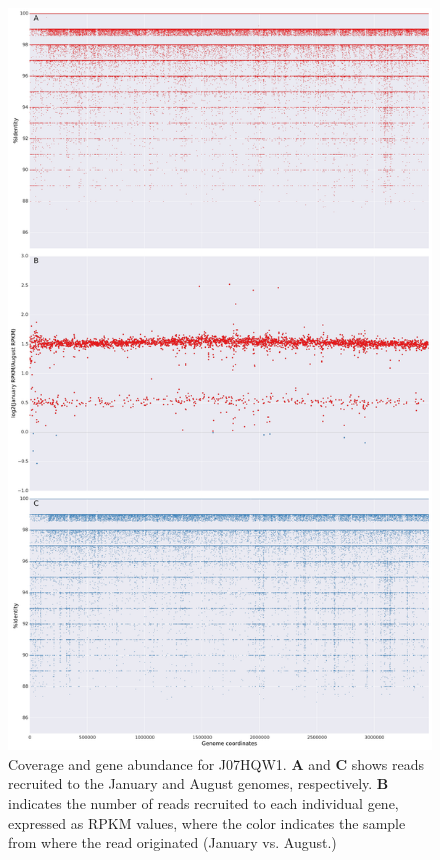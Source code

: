 
\begin{figure}[!hbtp]
  \centering
  \includegraphics[width=\textwidth,height=0.8\textheight,keepaspectratio]{Chapter5/Figures/coverage_plots/J07HWQ1_coverage.pdf}
  \caption{Coverage and gene abundance for J07HQW1. \textbf{A} and \textbf{C} shows reads recruited to the January and August genomes, respectively. \textbf{B} indicates the number of reads recruited to each individual gene, expressed as RPKM values, where the color indicates the sample from where the read originated (January vs. August.)}
  \label{J07HWQ1coverage}
\end{figure}


